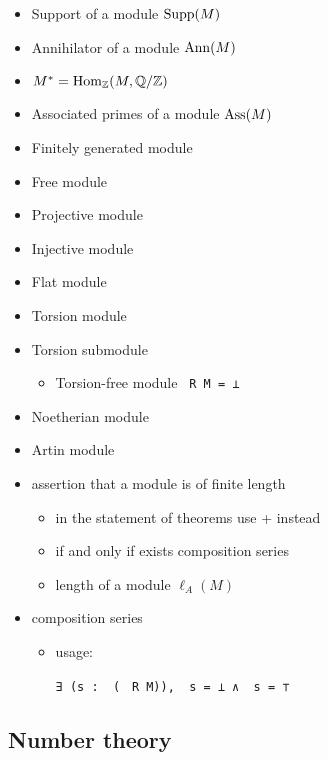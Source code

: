 \begin{itemize}
\item
Support of a module ${\mathrm{Supp}}(M)$ 
\item
Annihilator of a module ${\mathrm{Ann}}(M)$ 
\item
$M^*=\operatorname{Hom}_{\mathbb {Z}}(M,{\mathbb {Q}}/{\mathbb {Z}})$ 
\item
Associated primes of a module $\operatorname{Ass}(M)$ 
\item
Finitely generated module 
\item
Free module 
\item
Projective module 
\item
Injective module 
\item
Flat module 
\item
Torsion module 
\item
Torsion submodule 
\begin{itemize}
\item
Torsion-free module \verb| R M = ⊥|
\end{itemize}
\item
Noetherian module 
\item
Artin module 
\item
assertion that a module is of finite length 
\begin{itemize}
\item
in the statement of theorems use  +  instead
\item
if and only if exists composition series
\item
length of a module $\ell_A(M)$ 
\end{itemize}
\item
composition series 
\begin{itemize}
\item
usage:

\verb|∃ (s : |\verb| (|%
\verb| R M)), |\verb| s = ⊥ ∧ |\verb| s = ⊤|
\end{itemize}
\end{itemize}

\subsection{Number theory}

